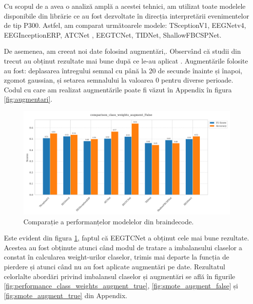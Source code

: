 Cu scopul de a avea o analiză amplă a acestei tehnici, am utilizat toate modelele disponibile din librărie ce au fost dezvoltate în direcția interpretării evenimentelor de tip P300. Astfel, am comparat următoarele modele: TSceptionV1\cite{TSception}, EEGNetv4\cite{eegnetv4}, EEGInceptionERP\cite{eeginceptionerp}, ATCNet \cite{atcnet1}\cite{atcnet2}\cite{atcnet3}, EEGTCNet\cite{tcnet}, TIDNet\cite{tidnet}, ShallowFBCSPNet\cite{ShallowFBCSPNet}.

De asemenea, am creeat noi date folosind augmentări,. Observând că studii din trecut au obținut rezultate mai bune după ce le-au aplicat \cite{Wang2018}. Augmentările folosite au fost: deplasarea întregului semnal cu până la 20 de secunde înainte și înapoi, zgomot gaussian, și setarea semnalului la valoarea 0 pentru diverse perioade. Codul cu care am realizat augmentările poate fi văzut în Appendix în figura \ref{fig:augmentari}.

\vspace{1em}
\begin{figure}[H]
\begin{center}

\end{center}
    \centering
		\vspace{-1em}
    \includegraphics[width=1\textwidth]{images/comparison_class_weights_augment_False.png}
    \caption{Comparație a performanțelor modelelor din braindecode\cite{braindecode}.}
		\vspace{-1em}
    \label{fig:performanta_braindecode}
\end{figure}

Este evident din figura \ref{fig:performanta_braindecode}, faptul că EEGTCNet\cite{tcnet} a obținut cele mai bune rezultate. Acestea au fost obținute atunci când modul de tratare a imbalansului claselor a constat în calcularea weight-urilor claselor, trimis mai departe la funcția de pierdere și atunci când nu au fost aplicate augmentări pe date. Rezultatul celorlalte abordări privind imbalansul claselor și augmentări se află în figurile \ref{fig:performance_class_weights_augment_true}, \ref{fig:smote_augment_false} și \ref{fig:smote_augment_true} din Appendix.


